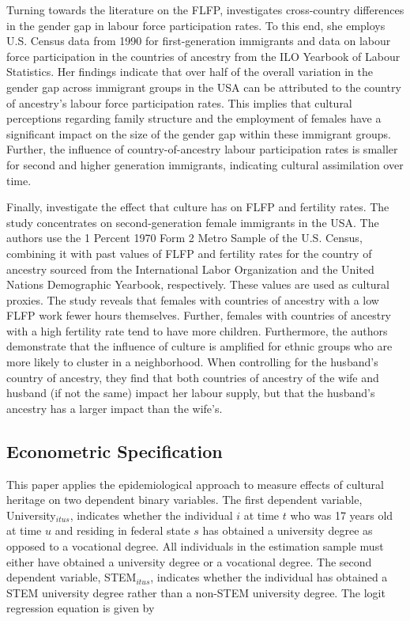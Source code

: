 \documentclass[a4paper, oneside, hyperfootnotes = false]{article}
\begin{document}
{Turning towards the literature on the FLFP, \cite{Antecol2000} investigates cross-country differences in the gender gap in labour force participation rates.
To this end, she employs U.S. Census data from 1990 for first-generation immigrants and data on labour force participation in the countries of ancestry from the ILO Yearbook of Labour Statistics.
Her findings indicate that over half of the overall variation in the gender gap across immigrant groups in the USA can be attributed to the country of ancestry's labour force participation rates.
This implies that cultural perceptions regarding family structure and the employment of females have a significant impact on the size of the gender gap within these immigrant groups.
Further, the influence of country-of-ancestry labour participation rates is smaller for second and higher generation immigrants, indicating cultural assimilation over time.

Finally, \cite{Fernandez2009} investigate the effect that culture has on FLFP and fertility rates.
The study concentrates on second-generation female immigrants in the USA.
The authors use the 1 Percent 1970 Form 2 Metro Sample of the U.S. Census, combining it with past values of FLFP and fertility rates for the country of ancestry sourced from the International Labor Organization and the United Nations Demographic Yearbook, respectively.
These values are used as cultural proxies.
The study reveals that females with countries of ancestry with a low FLFP work fewer hours themselves.
Further, females with countries of ancestry with a high fertility rate tend to have more children.
Furthermore, the authors demonstrate that the influence of culture is amplified for ethnic groups who are more likely to cluster in a neighborhood.
When controlling for the husband's country of ancestry, they find that both countries of ancestry of the wife and husband (if not the same) impact her labour supply, but that the husband's ancestry has a larger impact than the wife's.

\subsection{Econometric Specification}
\label{specification}

This paper applies the epidemiological approach to measure effects of cultural heritage on two dependent binary variables.
The first dependent variable, University$_{itus}$, indicates whether the individual $i$ at time $t$ who was 17 years old at time $u$ and residing in federal state $s$ has obtained a university degree as opposed to a vocational degree.
All individuals in the estimation sample must either have obtained a university degree or a vocational degree.
The second dependent variable, STEM$_{itus}$, indicates whether the individual has obtained a STEM university degree rather than a non-STEM university degree.
The logit regression equation is given by

}
\end{document}
